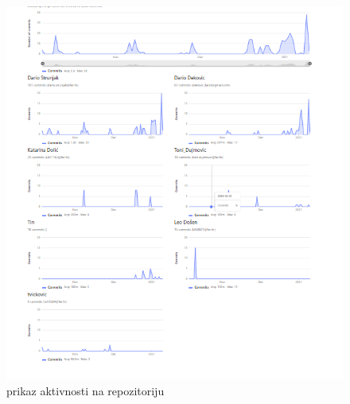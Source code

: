 	\begin{figure}[H]
		\centerline{\includegraphics[width=\linewidth]{slike/prikaz_aktivnosti.png}}
		\caption{prikaz aktivnosti na repozitoriju}
		\label{fig: prikaz aktivnosti na repozitoriju}
	\end{figure}
		
	